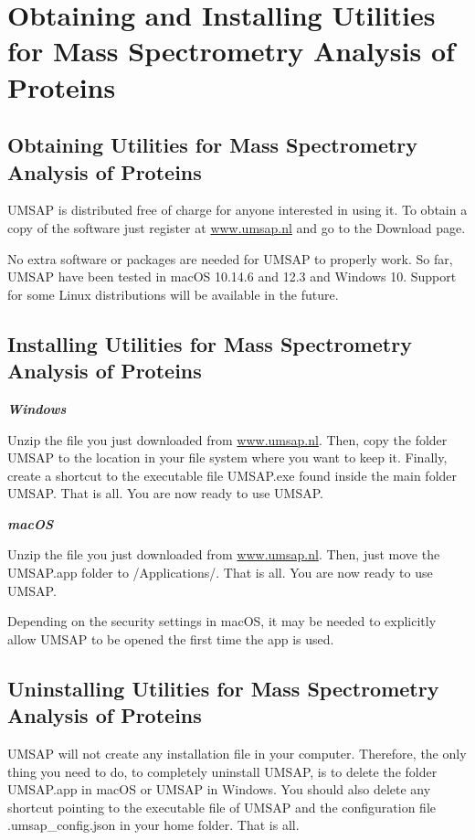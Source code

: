 \chapter{Obtaining and Installing Utilities for Mass Spectrometry Analysis of Proteins}

\section{Obtaining Utilities for Mass Spectrometry Analysis of Proteins}

UMSAP is distributed free of charge for anyone interested in using it. To obtain
a copy of the software just register at \href{https://www.umsap.nl}{www.umsap.nl}
and go to the Download page.

No extra software or packages are needed for UMSAP to properly work. So far, 
UMSAP have been tested in macOS \num[parse-numbers=false]{10.14.6} and
\num[parse-numbers=false]{12.3} and Windows \num{10}. Support for some Linux
distributions will be available in the future.

\section{Installing Utilities for Mass Spectrometry Analysis of Proteins}

\textit{\textbf{Windows}}

Unzip the file you just downloaded from \href{https://www.umsap.nl}{www.umsap.nl}.
Then, copy the folder UMSAP to the location in your file system where you want
to keep it. Finally, create a shortcut to the executable file UMSAP.exe found
inside the main folder UMSAP. That is all. You are now ready to use UMSAP.

\textit{\textbf{macOS}}

Unzip the file you just downloaded from \href{https://www.umsap.nl}{www.umsap.nl}.
Then, just move the UMSAP.app folder to /Applications/. That is all. You are now
ready to use UMSAP. 

Depending on the security settings in macOS, it may be needed to explicitly allow
UMSAP to be opened the first time the app is used.

\section{Uninstalling Utilities for Mass Spectrometry Analysis of Proteins}

UMSAP will not create any installation file in your computer. Therefore, the only
thing you need to do, to completely uninstall UMSAP, is to delete the folder
UMSAP.app in macOS or UMSAP in Windows. You should also delete any shortcut
pointing to the executable file of UMSAP and the configuration file
.umsap\_config.json in your home folder. That is all.